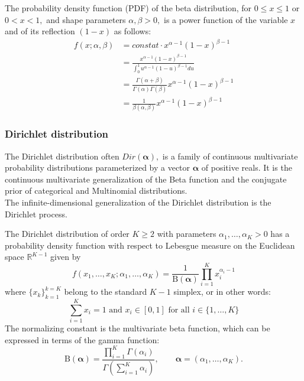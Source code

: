 					\begin{defn}
						The probability density function (PDF) of the beta distribution, for $0 \le x \le 1$ or $0 < x < 1,$ and shape parameters $\alpha, \beta > 0,$ is a power function of the variable $x$ and of its reflection $(1 - x)$ as follows:
						\begin{equation}
							\begin{aligned}
								f(x; \alpha,\beta) &= constat \cdot x^{\alpha-1} (1-x)^{\beta - 1}\\
								&= \frac{x^{\alpha-1} (1-x)^{\beta - 1}}{\int_{0}^{1} u^{\alpha - 1}(1-u)^{\beta - 1} du}\\
								&= \frac{\Gamma (\alpha+\beta)}{\Gamma(\alpha)\Gamma(\beta)}x^{\alpha - 1}(1 - x)^{\beta - 1}\\
								&= \frac{1}{\beta(\alpha,\beta)}x^{\alpha - 1}(1 - x)^{\beta - 1}
							\end{aligned}
						\end{equation}
					\end{defn}
				\subsubsection{Dirichlet distribution}
					The Dirichlet distribution often	$Dir({\boldsymbol {\alpha }}),$ is a family of continuous multivariate probability distributions parameterized by a vector ${\boldsymbol {\alpha }}$ of positive reals.
					It is the continuous multivariate generalization of the Beta function and the conjugate prior of categorical and Multinomial distributions.\\
					The infinite-dimensional generalization of the Dirichlet distribution is the Dirichlet process.

				\begin{defn} \cite{Minka2012EstimatingAD}
						The Dirichlet distribution of order $K \ge 2$ with parameters $\alpha_1, \dots, \alpha_K > 0$ has a probability density function with respect to Lebesgue measure on the Euclidean space $\mathbb{R}^{K-1}$ given by
						\begin{equation}
							f\left(x_{1},\ldots ,x_{K};\alpha _{1},\ldots ,\alpha _{K}\right)={\frac {1}{\mathrm {B} ({\boldsymbol {\alpha }})}}\prod _{i=1}^{K}x_{i}^{\alpha _{i}-1}
						\end{equation}
						where $\{x_{k}\}_{k=1}^{k=K}$ belong to the standard $K-1$ simplex, or in other words:
						\begin{equation}
							\sum _{i=1}^{K}x_{i}=1{\mbox{ and }}x_{i}\in \left[0,1\right]{\mbox{ for all }}i\in \{1,\dots ,K\}
						\end{equation}
						The normalizing constant is the multivariate beta function, which can be expressed in terms of the gamma function:
						\begin{equation}
							\mathrm {B} ({\boldsymbol {\alpha }}) = {
								\frac {\prod \limits _{i=1}^{K}\Gamma (\alpha _{i})}
								{\Gamma \left(\sum \limits _{i=1}^{K}\alpha _{i}\right)}},
							\qquad {\boldsymbol {\alpha }}=(\alpha _{1},\ldots ,\alpha _{K}).
						\end{equation}
					\end{defn}
